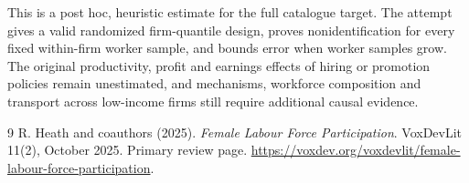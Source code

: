 \documentclass[11pt]{article}
\theoremstyle{remark}
\begin{document}
This is a post hoc, heuristic estimate for the full catalogue target.
The attempt gives a valid randomized firm-quantile design, proves nonidentification for every fixed within-firm worker sample, and bounds error when worker samples grow. The original productivity, profit and earnings effects of hiring or promotion policies remain unestimated, and mechanisms, workforce composition and transport across low-income firms still require additional causal evidence.

\begin{thebibliography}{9}
 R. Heath and coauthors (2025). \emph{Female Labour Force Participation}. VoxDevLit 11(2), October 2025. Primary review page. \url{https://voxdev.org/voxdevlit/female-labour-force-participation}.
\end{thebibliography}
\end{document}
